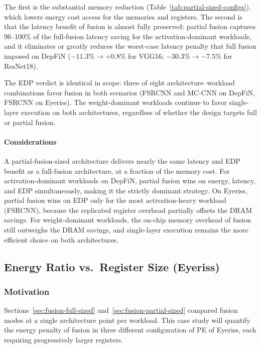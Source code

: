 The first is the substantial memory reduction
(Table~\ref{tab:partial-sized-configs}), which lowers energy cost access for the memories and registers.
The second is that the latency benefit of fusion is almost fully
preserved: partial fusion captures $96$--$100\%$ of the
full-fusion latency saving for the activation-dominant workloads,
and it eliminates or greatly reduces the worst-case latency
penalty that full fusion imposed on DepFiN
($-11.3\%{\to}+0.8\%$ for VGG16; $-30.3\%{\to}-7.5\%$ for
ResNet18).


The EDP verdict is identical in scope: three of eight
architecture--workload combinations favor fusion in both
scenarios (FSRCNN and MC-CNN on DepFiN, FSRCNN on Eyeriss).
The weight-dominant workloads continue to favor single-layer
execution on both architectures, regardless of whether the
design targets full or partial fusion.

\paragraph{Considerations}
A partial-fusion-sized architecture delivers nearly the same
latency and EDP benefit as a full-fusion architecture, at a
fraction of the memory cost.
For activation-dominant workloads on DepFiN, partial fusion
wins on energy, latency, and EDP simultaneously, making it
the strictly dominant strategy.
On Eyeriss, partial fusion wins on EDP only for the most
activation-heavy workload (FSRCNN), because the replicated
register overhead partially offsets the DRAM savings.
For weight-dominant workloads, the on-chip memory overhead of
fusion still outweighs the DRAM savings,
and single-layer execution remains the more efficient choice
on both architectures.
\subsection{Energy Ratio vs.\ Register Size
  (Eyeriss)}
\label{sec:fusion-fixed-scaling}

\subsubsection{Motivation}

Sections~\ref{sec:fusion-full-sized} and~\ref{sec:fusion-partial-sized}
compared fusion modes at a single architecture point per workload.
This case study will quantify the energy penalty of fusion in three different configuration of PE of Eyeriss, each requiring
progressively larger registers.

